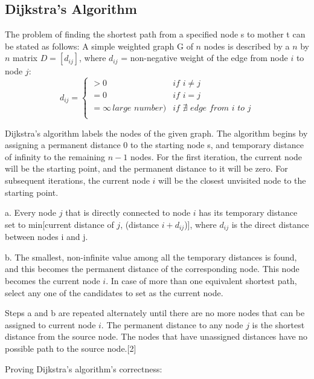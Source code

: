 \documentclass[letter,10pt]{article}
\begin{document}
\subsection*{Dijkstra's Algorithm}
The problem of finding the shortest path from a specified node s to mother t can be stated as follows:
A simple weighted graph G of $n$ nodes is described by a $n$ by $n$ matrix $D=[d_{ij}]$, where $d_{ij}$ = non-negative weight of the edge from node $i$ to node $j$:
\[ d_{ij} =  \left\{
\begin{array}{ll}
      > 0 & if \, \, i \neq j \\
      = 0 & if \, \, i = j \\
      = \infty \,large \, \, number)& if \, \, \nexists \, \, edge \,\,from \,\, i \, \, to \,\, j \\
\end{array} 
\right. \]

Dijkstra's algorithm labels the nodes of the given graph. The algorithm begins by assigning a permanent distance 0 to the starting node s, and temporary distance of infinity to the remaining $n-1$ nodes. For the first iteration, the current node will be the starting point, and the permanent distance to it will be zero. For subsequent iterations, the current node $i$ will be the closest unvisited node to the starting point. 

\begin{adjustwidth}{1cm}{}

a. Every node $j$ that is directly connected to node $i$ has its temporary distance set to min[current distance of $j$, (distance $i + d_{ij}$)], where $d_{ij}$ is the direct distance between nodes i and j. 

\noindent
b. The smallest, non-infinite value among all the temporary distances is found, and this becomes the permanent distance of the corresponding node. This node becomes the current node $i$. In case of more than one equivalent shortest path, select any one of the candidates to set as the current node.
\end{adjustwidth}

Steps a and b are repeated alternately until there are no more nodes that can be assigned to current node $i$. The permanent distance to any node $j$ is the shortest distance from the source node. The nodes that have unassigned distances have no possible path to the source node.[2]

Proving Dijkstra's algorithm's correctness:
\end{document}
